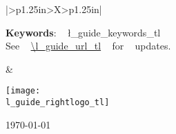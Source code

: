 {\begin{tabularx}{\textwidth}{|>{\centering\arraybackslash}p{1.25in}>{\centering\arraybackslash}X>{\raggedleft\arraybackslash}p{1.25in}|}
\begin{minipage}[c][1\totalheight][b]{3.5in}
\begin{minipage}[t]{1\columnwidth}
\begin{center}
          \par
        \end{center}
      \end{minipage}      
      \smallskip
      \par     
      \begin{flushleft}
        \medskip
        \textbf{Keywords}: ~ \l_guide_keywords_tl \\
        See ~ \url{\l_guide_url_tl} ~ for ~ updates.
        \par
      \end{flushleft}
      \smallskip
    \end{minipage} &
    \begin{minipage}[c]{\linewidth}
      \begin{center}
        \texttt{[image: \\l\_guide\_rightlogo\_tl]}
        \par
        \bigskip
        \crmda\today
      \end{center}%
    \end{minipage} 
    \tabularnewline
    \hline 
  \end{tabularx}
}
\ExplSyntaxOff



\usepackage{xcolor}
\usepackage[unicode=true,pdfusetitle,
bookmarks=true,bookmarksnumbered=false, bookmarksopen=false,
breaklinks=true, pdfborder={0 0 0},
pdfborderstyle={}, backref=false,
colorlinks=true, linkcolor=darkblue, urlcolor=darkblue, 
citecolor=darkblue] {hyperref}


\renewenvironment{figure}[1][]{%
 \ifthenelse{\equal{#1}{}}{%
   \@float{figure}
 }{%
   \@float{figure}[#1]%
 }%
 \centering
}{%
 \end@float
}
\renewenvironment{table}[1][]{%
 \ifthenelse{\equal{#1}{}}{%
   \@float{table}
 }{%
   \@float{table}[#1]%
 }%

 \centering
}{%
 \end@float
}

